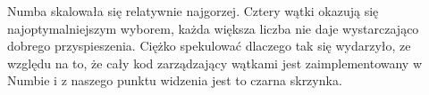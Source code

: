 Numba skalowała się relatywnie najgorzej.
Cztery wątki okazują się najoptymalniejszym wyborem,
każda większa liczba nie daje wystarczająco dobrego przyspieszenia.
Ciężko spekulować dlaczego tak się wydarzyło, ze względu na to,
że cały kod zarządzający wątkami jest zaimplementowany w Numbie
i z naszego punktu widzenia jest to czarna skrzynka.

